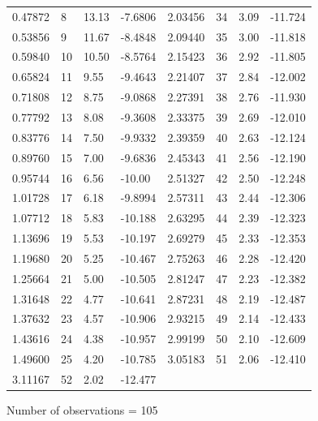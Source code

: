 \documentclass[10pt, a4paper]{article}
\begin{document}
\begin{appendices}
\begin{table}[H]
\begin{small}
\begin{center}
\begin{tabular}{|p{15mm} p{15mm} p{15mm} p{15mm} || p{15mm} p{15mm}p{15mm} p{15mm}|}
		 0.47872     &  8     &      13.13   &      -7.6806 & 2.03456    &  34    &        3.09         &-11.724\\ 
		 0.53856     &  9     &      11.67   &      -8.4848  & 2.09440    &  35    &        3.00    &     -11.818\\ 
		 0.59840     & 10    &       10.50  &       -8.5764 &    2.15423    &  36    &        2.92    &     -11.805\\ 
		 0.65824     & 11    &        9.55   &      -9.4643 &  2.21407    &  37    &        2.84    &     -12.002\\ 
		 0.71808     & 12    &        8.75   &      -9.0868 &  2.27391    &  38    &        2.76    &     -11.930\\ 
		 0.77792     & 13    &        8.08   &      -9.3608 &  2.33375    &  39    &        2.69    &     -12.010\\ 
		 0.83776     & 14    &        7.50     &    -9.9332 &  2.39359    &  40    &        2.63    &     -12.124\\ 
		 0.89760     & 15    &        7.00     &    -9.6836 &  2.45343    &  41    &        2.56    &     -12.190\\ 
		 0.95744     & 16    &        6.56     &    -10.00  & 2.51327    &  42           & 2.50    &     -12.248\\ 
		 1.01728     & 17    &        6.18     &    -9.8994 & 2.57311    &  43      &      2.44    &     -12.306\\ 
		 1.07712     & 18    &        5.83     &    -10.188 & 2.63295    &  44      &      2.39    &     -12.323\\ 
		 1.13696     & 19    &        5.53     &    -10.197 & 2.69279    &  45      &      2.33    &     -12.353\\ 
		 1.19680     & 20    &        5.25     &    -10.467 &  2.75263    &  46      &      2.28    &     -12.420\\ 
		 1.25664     & 21    &        5.00     &    -10.505 &  2.81247    &  47      &      2.23    &     -12.382\\ 
		 1.31648     & 22    &        4.77    &    -10.641 &  2.87231    &  48      &      2.19    &     -12.487\\ 
		 1.37632     & 23    &        4.57     &    -10.906 &  2.93215    &  49      &    2.14      &   -12.433\\ 
		 1.43616     & 24    &        4.38     &    -10.957 &  2.99199    &  50        &    2.10    &     -12.609\\ 
		 1.49600      &25    &        4.20     &    -10.785 &   3.05183    &  51      &      2.06    &     -12.410\\ 
		 3.11167    &  52      &      2.02    &     -12.477 & & & & \\   \hline \hline
	\end{tabular}
	\end{center}
	\end{small}
	Number of observations = 105
\end{table}


\end{appendices}
\end{document}
